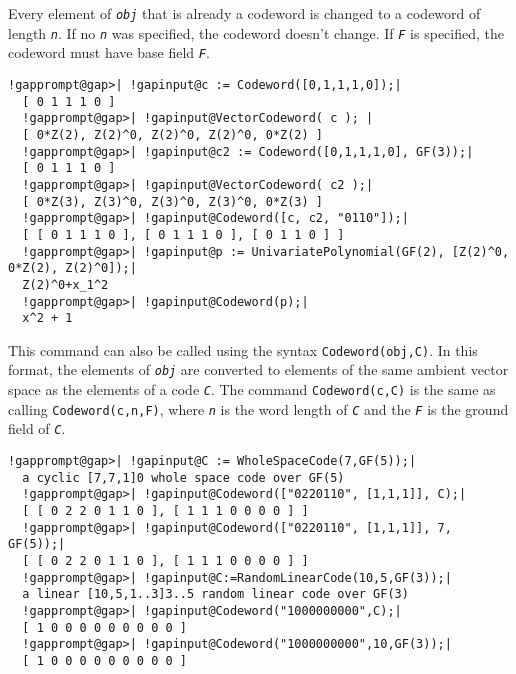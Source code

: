 \documentclass[a4paper,11pt]{report}
\begin{document}
{{{ Every element of \mbox{\texttt{\mdseries\slshape obj}} that is already a codeword is changed to a codeword of length \mbox{\texttt{\mdseries\slshape n}}. If no \mbox{\texttt{\mdseries\slshape n}} was specified, the codeword doesn't change. If \mbox{\texttt{\mdseries\slshape F}} is specified, the codeword must have base field \mbox{\texttt{\mdseries\slshape F}}. 
\begin{Verbatim}[commandchars=!@|,fontsize=\small,frame=single,label=Example]
  !gapprompt@gap>| !gapinput@c := Codeword([0,1,1,1,0]);|
  [ 0 1 1 1 0 ]
  !gapprompt@gap>| !gapinput@VectorCodeword( c ); |
  [ 0*Z(2), Z(2)^0, Z(2)^0, Z(2)^0, 0*Z(2) ]
  !gapprompt@gap>| !gapinput@c2 := Codeword([0,1,1,1,0], GF(3));|
  [ 0 1 1 1 0 ]
  !gapprompt@gap>| !gapinput@VectorCodeword( c2 );|
  [ 0*Z(3), Z(3)^0, Z(3)^0, Z(3)^0, 0*Z(3) ]
  !gapprompt@gap>| !gapinput@Codeword([c, c2, "0110"]);|
  [ [ 0 1 1 1 0 ], [ 0 1 1 1 0 ], [ 0 1 1 0 ] ]
  !gapprompt@gap>| !gapinput@p := UnivariatePolynomial(GF(2), [Z(2)^0, 0*Z(2), Z(2)^0]);|
  Z(2)^0+x_1^2
  !gapprompt@gap>| !gapinput@Codeword(p);|
  x^2 + 1 
\end{Verbatim}
  

 This command can also be called using the syntax \texttt{Codeword(obj,C)}. In this format, the elements of \mbox{\texttt{\mdseries\slshape obj}} are converted to elements of the same ambient vector space as the elements of
a code \mbox{\texttt{\mdseries\slshape C}}. The command \texttt{Codeword(c,C)} is the same as calling \texttt{Codeword(c,n,F)}, where \mbox{\texttt{\mdseries\slshape n}} is the word length of \mbox{\texttt{\mdseries\slshape C}} and the \mbox{\texttt{\mdseries\slshape F}} is the ground field of \mbox{\texttt{\mdseries\slshape C}}. }

 
\begin{Verbatim}[commandchars=!@|,fontsize=\small,frame=single,label=Example]
  !gapprompt@gap>| !gapinput@C := WholeSpaceCode(7,GF(5));|
  a cyclic [7,7,1]0 whole space code over GF(5)
  !gapprompt@gap>| !gapinput@Codeword(["0220110", [1,1,1]], C);|
  [ [ 0 2 2 0 1 1 0 ], [ 1 1 1 0 0 0 0 ] ]
  !gapprompt@gap>| !gapinput@Codeword(["0220110", [1,1,1]], 7, GF(5));|
  [ [ 0 2 2 0 1 1 0 ], [ 1 1 1 0 0 0 0 ] ] 
  !gapprompt@gap>| !gapinput@C:=RandomLinearCode(10,5,GF(3));|
  a linear [10,5,1..3]3..5 random linear code over GF(3)
  !gapprompt@gap>| !gapinput@Codeword("1000000000",C);|
  [ 1 0 0 0 0 0 0 0 0 0 ]
  !gapprompt@gap>| !gapinput@Codeword("1000000000",10,GF(3));|
  [ 1 0 0 0 0 0 0 0 0 0 ]
\end{Verbatim}
  

}}
\end{document}
